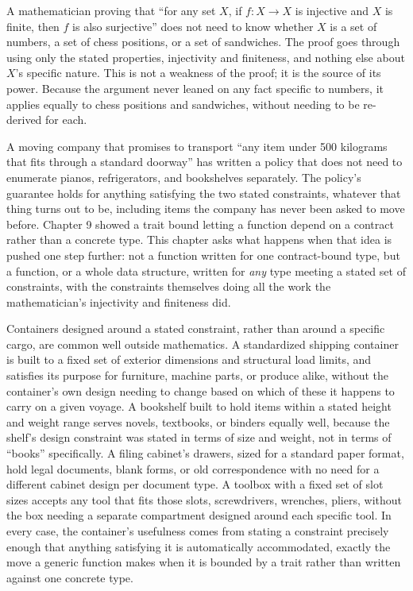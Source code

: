 \documentclass[11pt]{book}
\begin{document}
A mathematician proving that ``for any set $X$, if $f: X \to X$ is injective and $X$ is finite, then $f$ is also surjective'' does not need to know whether $X$ is a set of numbers, a set of chess positions, or a set of sandwiches. The proof goes through using only the stated properties, injectivity and finiteness, and nothing else about $X$'s specific nature. This is not a weakness of the proof; it is the source of its power. Because the argument never leaned on any fact specific to numbers, it applies equally to chess positions and sandwiches, without needing to be re-derived for each.

A moving company that promises to transport ``any item under 500 kilograms that fits through a standard doorway'' has written a policy that does not need to enumerate pianos, refrigerators, and bookshelves separately. The policy's guarantee holds for anything satisfying the two stated constraints, whatever that thing turns out to be, including items the company has never been asked to move before. Chapter 9 showed a trait bound letting a function depend on a contract rather than a concrete type. This chapter asks what happens when that idea is pushed one step further: not a function written for one contract-bound type, but a function, or a whole data structure, written for \emph{any} type meeting a stated set of constraints, with the constraints themselves doing all the work the mathematician's injectivity and finiteness did.

Containers designed around a stated constraint, rather than around a specific cargo, are common well outside mathematics. A standardized shipping container is built to a fixed set of exterior dimensions and structural load limits, and satisfies its purpose for furniture, machine parts, or produce alike, without the container's own design needing to change based on which of these it happens to carry on a given voyage. A bookshelf built to hold items within a stated height and weight range serves novels, textbooks, or binders equally well, because the shelf's design constraint was stated in terms of size and weight, not in terms of ``books'' specifically. A filing cabinet's drawers, sized for a standard paper format, hold legal documents, blank forms, or old correspondence with no need for a different cabinet design per document type. A toolbox with a fixed set of slot sizes accepts any tool that fits those slots, screwdrivers, wrenches, pliers, without the box needing a separate compartment designed around each specific tool. In every case, the container's usefulness comes from stating a constraint precisely enough that anything satisfying it is automatically accommodated, exactly the move a generic function makes when it is bounded by a trait rather than written against one concrete type.
\end{document}
